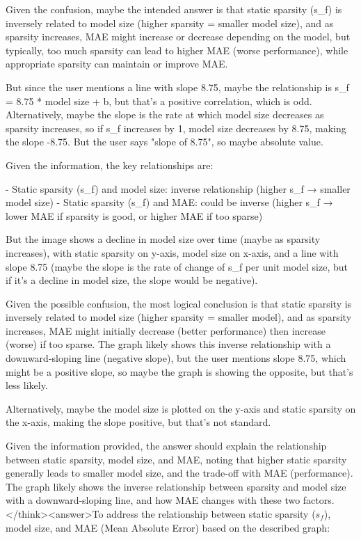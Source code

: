 Given the confusion, maybe the intended answer is that static sparsity (s_f) is inversely related to model size (higher sparsity = smaller model size), and as sparsity increases, MAE might increase or decrease depending on the model, but typically, too much sparsity can lead to higher MAE (worse performance), while appropriate sparsity can maintain or improve MAE. 

But since the user mentions a line with slope 8.75, maybe the relationship is s_f = 8.75 * model size + b, but that's a positive correlation, which is odd. Alternatively, maybe the slope is the rate at which model size decreases as sparsity increases, so if s_f increases by 1, model size decreases by 8.75, making the slope -8.75. But the user says "slope of 8.75", so maybe absolute value. 

Given the information, the key relationships are:

- Static sparsity (s_f) and model size: inverse relationship (higher s_f → smaller model size)
- Static sparsity (s_f) and MAE: could be inverse (higher s_f → lower MAE if sparsity is good, or higher MAE if too sparse)

But the image shows a decline in model size over time (maybe as sparsity increases), with static sparsity on y-axis, model size on x-axis, and a line with slope 8.75 (maybe the slope is the rate of change of s_f per unit model size, but if it's a decline in model size, the slope would be negative). 

Given the possible confusion, the most logical conclusion is that static sparsity is inversely related to model size (higher sparsity = smaller model), and as sparsity increases, MAE might initially decrease (better performance) then increase (worse) if too sparse. The graph likely shows this inverse relationship with a downward-sloping line (negative slope), but the user mentions slope 8.75, which might be a positive slope, so maybe the graph is showing the opposite, but that's less likely. 

Alternatively, maybe the model size is plotted on the y-axis and static sparsity on the x-axis, making the slope positive, but that's not standard. 

Given the information provided, the answer should explain the relationship between static sparsity, model size, and MAE, noting that higher static sparsity generally leads to smaller model size, and the trade-off with MAE (performance). The graph likely shows the inverse relationship between sparsity and model size with a downward-sloping line, and how MAE changes with these two factors.</think><answer>To address the relationship between static sparsity (\(s_f\)), model size, and MAE (Mean Absolute Error) based on the described graph:  


